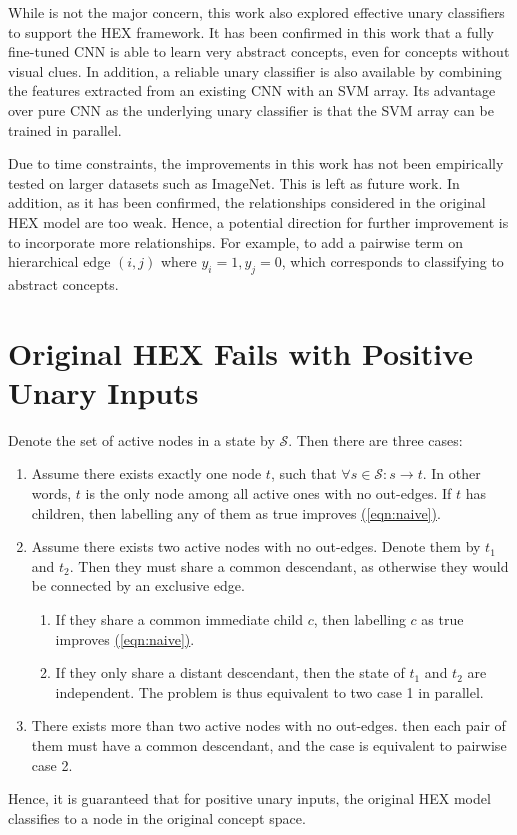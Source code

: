 \documentclass[11pt,a4paper]{article}
\begin{document}
While is not the major concern, this work also explored effective unary classifiers to support the HEX framework. 
It has been confirmed in this work that a fully fine-tuned CNN is able to learn very abstract concepts, even for concepts without visual clues. In addition, a reliable unary classifier is also available by combining the features extracted from an existing CNN with an SVM array. Its advantage over pure CNN as the underlying unary classifier is that the SVM array can be trained in parallel.

Due to time constraints, the improvements in this work has not been empirically tested on larger datasets such as ImageNet. This is left as future work. In addition, as it has been confirmed, the relationships considered in the original HEX model are too weak. Hence, a potential direction for further improvement is to incorporate more relationships. For example, to add a pairwise term on hierarchical edge $(i,j)$ where $y_i=1,y_j=0$, which corresponds to classifying to abstract concepts.

\appendix
\section{Original HEX Fails with Positive Unary Inputs}
\label{sec:fail}

Denote the set of active nodes in a state by $\mathcal{S}$. Then there are three cases:
\begin{enumerate}
\item Assume there exists exactly one node $t$, such that $\forall s\in\mathcal{S}:s\rightarrow t$. In other words, $t$ is the only node among all active ones with no out-edges. If $t$ has children, then labelling any of them as true improves \hyperref[eqn:naive]{(\ref{eqn:naive})}.
\item Assume there exists two active nodes with no out-edges. Denote them by $t_1$ and $t_2$. Then they must share a common descendant, as otherwise they would be connected by an exclusive edge.
\begin{enumerate}
\item If they share a common immediate child $c$, then labelling $c$ as true improves \hyperref[eqn:naive]{(\ref{eqn:naive})}.
\item If they only share a distant descendant, then the state of $t_1$ and $t_2$ are independent. The problem is thus equivalent to two case 1 in parallel.
\end{enumerate}
\item There exists more than two active nodes with no out-edges. then each pair of them must have a common descendant, and the case is equivalent to pairwise case 2.
\end{enumerate}
Hence, it is guaranteed that for positive unary inputs, the original HEX model classifies to a node in the original concept space.
\end{document}
